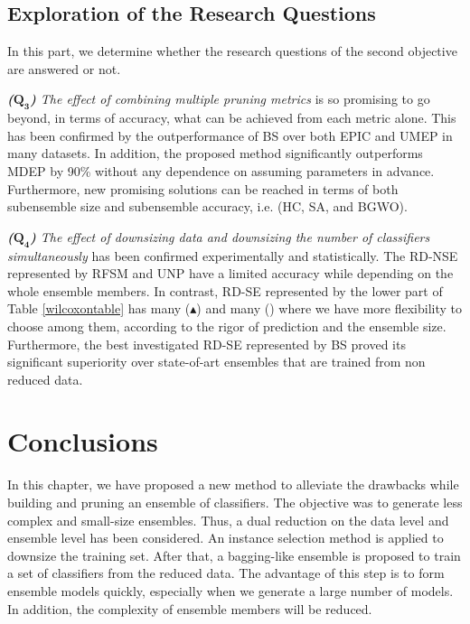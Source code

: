 %
%
\subsection{Exploration of the Research Questions} 

In this part, we determine whether the research questions of the second objective are answered or not. 

\textit{\textbf{($\pmb{Q_3}$)} The effect of combining multiple pruning metrics} is so promising to go beyond, in terms of accuracy, what can be achieved from each metric alone. This has been confirmed by the outperformance of BS over both EPIC and UMEP in many datasets. In addition, the proposed method significantly outperforms MDEP by 90\% without any dependence on assuming parameters in advance. Furthermore, new promising solutions can be reached in terms of both subensemble size and subensemble accuracy, i.e. (HC, SA, and BGWO). 

\textit{\textbf{($\pmb{Q_4}$)} The effect of downsizing data and downsizing the number of classifiers simultaneously} has been confirmed experimentally and statistically. The RD-NSE represented by RFSM and UNP have a limited accuracy while depending on the whole ensemble members. In contrast, RD-SE represented by the lower part of Table \ref{wilcoxontable} has many ($\blacktriangle$) and many (\textbullet) where we have more flexibility to choose among them, according to the rigor of prediction and the ensemble size. Furthermore, the best investigated RD-SE represented by BS proved its significant superiority over state-of-art ensembles that are trained from non reduced data. 

\section{Conclusions}
\label{ch5_conclusions}
In this chapter,  we have proposed a new method to alleviate the drawbacks while building and pruning an ensemble of classifiers. The objective was to generate less complex and small-size ensembles. Thus, a dual reduction on the data level and ensemble level has been considered. An instance selection method is applied to downsize the training set. After that, a bagging-like ensemble is proposed to train a set of classifiers from the reduced data. The advantage of this step is to form ensemble models quickly, especially when we generate a large number of models. In addition, the complexity of ensemble members will be reduced. 

